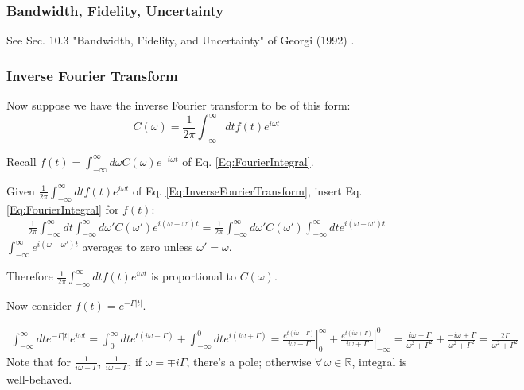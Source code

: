\documentclass[10pt]{amsart}
\begin{document}
\begin{multicols*}{2}
\subsubsection{Bandwidth, Fidelity, Uncertainty}

See Sec. 10.3 "Bandwidth, Fidelity, and Uncertainty" of Georgi (1992) \cite{Geor1992}.

\subsubsection{Inverse Fourier Transform}

Now suppose we have the inverse Fourier transform to be of this form:
\begin{equation}\label{Eq:InverseFourierTransform}
C(\omega) = \frac{1}{ 2\pi} \int_{-\infty}^{\infty} dt f(t) e^{i\omega t}
\end{equation}

Recall $f(t) = \int_{-\infty}^{\infty} d\omega C(\omega) e^{-i\omega t}$ of Eq. \ref{Eq:FourierIntegral}. 

Given $\frac{1}{2\pi}\int_{-\infty}^{\infty} dt f(t) e^{i\omega t}$ of Eq. \ref{Eq:InverseFourierTransform}, insert Eq. \ref{Eq:FourierIntegral} for $f(t)$:
\[
\begin{gathered}
	\frac{1}{2\pi} \int_{-\infty}^{\infty}dt \int_{-\infty}^{\infty} d\omega' C(\omega') e^{i (\omega- \omega')t} = \frac{1}{2\pi} \int_{-\infty}^{\infty} d\omega' C(\omega') \int_{-\infty}^{\infty} dt e^{i (\omega - \omega') t} 
\end{gathered}
\]
$\int_{-\infty}^{\infty} e^{ i(\omega - \omega') t} $ averages to zero unless $\omega' = \omega$.

Therefore $\frac{1}{2\pi} \int_{-\infty}^{\infty} dt f(t) e^{i\omega t} $ is proportional to $C(\omega)$.

Now consider $f(t) = e^{-\Gamma|t|}$.

\[
\begin{gathered}
	\int_{-\infty}^{\infty} dt e^{-\Gamma|t|} e^{i\omega t} =\int_0^{\infty} dt e^{t(i\omega - \Gamma)} + \int_{-\infty}^0 dt e^{i(i\omega + \Gamma) } = \left. \frac{ e^{t(i\omega - \Gamma)} }{ i\omega - \Gamma} \right|_0^{\infty} + \left. \frac{ e^{t(i\omega + \Gamma)} }{ i\omega + \Gamma} \right|_{-\infty}^0 = \frac{ i\omega + \Gamma}{ \omega^2 + \Gamma^2} + \frac{-i\omega + \Gamma}{ \omega^2 +\Gamma^2} = \frac{2\Gamma}{ \omega^2 + \Gamma^2}
\end{gathered}
\]
Note that for $\frac{1}{ i\omega - \Gamma}$, $\frac{1}{ i\omega + \Gamma}$, if $\omega = \mp i\Gamma$, there's a pole; otherwise $\forall \, \omega \in \mathbb{R}$, integral is well-behaved.


\end{multicols*}
\end{document}
